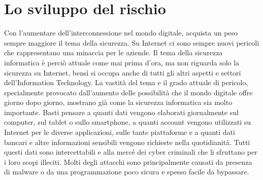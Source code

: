 \section{Lo sviluppo del rischio}
Con l’aumentare dell’interconnessione nel mondo digitale, acquista un peso sempre maggiore il tema della sicurezza. Su Internet ci sono sempre nuovi pericoli che rappresentano una minaccia per le aziende. Il tema della sicurezza informatica è perciò attuale come mai prima d’ora, ma non riguarda solo la sicurezza su Internet, bensì si occupa anche di tutti gli altri aspetti e settori dell’Information Technology. La vastità del tema e il grado attuale di pericolo, specialmente provocato dall'aumento delle possibilità che il mondo digitale offre giorno dopo giorno, mostrano già come la sicurezza informatica sia molto importante. Basti pensare a quanti dati vengono elaborati giornalmente sul computer, sul tablet o sullo smartphone, a quanti account vengono utilizzati su Internet per le diverse applicazioni, sulle tante piattaforme e a quanti dati bancari e altre informazioni sensibili vengono richieste nella quotidianità. Tutti questi dati sono intercettabili e alla mercé dei cyber criminali che li sfruttano per i loro scopi illeciti. 
Molti degli attacchi sono principalmente causati da presenza di malware o da una programmazione poco sicura e spesso facile da bypassare.
